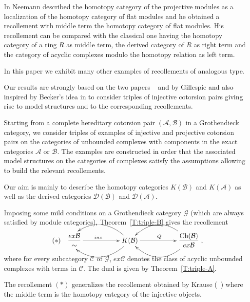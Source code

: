\documentclass[11pt,a4paper,reqno]{amsart}
\newcommand{\A}{\mathcal{A}}
\newcommand{\B}{\mathcal{B}}
\newcommand{\C}{\mathcal{C}}
\newcommand{\D}{\mathcal{D}}
\newcommand{\G}{\mathcal{G}}
\newcommand{\Ch}{\mathrm{Ch}}
\theoremstyle{plain}
\theoremstyle{definition}
\theoremstyle{remark}
\begin{document}
In \cite{Nee08} Neemann described the homotopy category of the projective modules as a localization of the homotopy category of flat modules and he obtained a recollement  with middle  term the homotopy category of flat modules. His recollement can be compared with the classical one having the homotopy category of a ring $R$ as middle term, the derived category of $R$ as right term and the category of acyclic complexes modulo the homotopy relation as left term.


In this paper we exhibit many other examples of recollements of analogous type.

Our results are strongly based on the two papers ~\cite{G6} and \cite{G7} by Gillespie and also inspired by Becker's idea in \cite{Beck12} to consider triples of injective cotorsion pairs giving rise to model structures and to the corresponding recollements.


Starting from a complete hereditary cotorsion pair $(\A, \B)$ in a Grothendieck category, we consider triples of examples of injective and projective cotorsion pairs on the categories of unbounded complexes with components in the exact categories $\A$ or $\B$.
The examples are constructed in order that the associated model structures on the categories of complexes satisfy the assumptions allowing to build the relevant recollements.

Our aim is mainly to describe the homotopy categories $K(\B)$ and $K(\A)$ as well as the derived categories $\D(\B)$ and $\D(\A)$.

Imposing some mild conditions on a Grothendieck category $\G$ (which are always satisfied by module categories), Theorem~\ref{T:triple-B} gives the recollement %
\vskip0.7cm
\[
  \xymatrix{ (\ast) \quad \dfrac{ex\B}{\sim} \ar[rr]^{inc} &&{K(\B)} \ar@/^2pc/[ll]\ar@/_2pc/[ll] \ar[rr]^{Q}
                                           &&{\dfrac{\Ch(\B)}{ex\B }}\ar@/^2pc/ [ll] \ar@/_2pc/ [ll] },
\]
\vskip0.7cm
 where for every subcategory $\C$ of $\G$, $ex{\C}$ denotes the class of acyclic unbounded complexes with terms in $\C$.
The dual is given by Theorem~\ref{T:triple-A}.


 The  recollement $(\ast)$ generalizes the recollement obtained by Krause (~\cite{Kr05}) where the middle term is the homotopy category of the injective objects.
\end{document}
